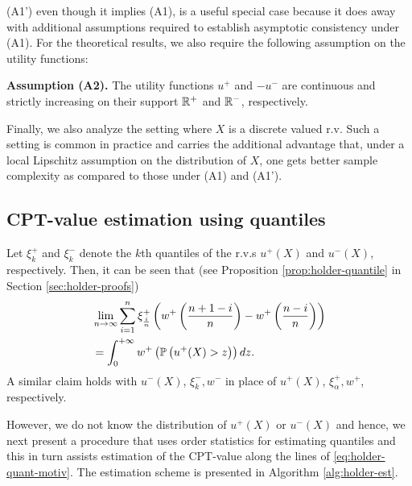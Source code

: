 (A1') even though it implies (A1), is a useful special case because it does away with additional assumptions required to establish asymptotic consistency under (A1). For the theoretical results, we also require the following assumption on the utility functions:

\noindent\textbf{Assumption (A2).}  The utility functions $u^+$ and $-u^-$ are continuous and strictly increasing on their support $\mathbb{R}^+$ and $\mathbb{R}^-$, respectively.

Finally, we also analyze the setting where $X$ is a discrete valued r.v. Such a setting is common in practice and carries the additional advantage that, under a local Lipschitz assumption on the distribution of $X$, one gets better sample complexity as compared to those under (A1) and (A1'). 



\subsection{CPT-value estimation using quantiles}
Let $\xi^+_{k}$ and $\xi^-_{k}$ denote the $k$th quantiles of the r.v.s $u^+(X)$ and $u^-(X)$, respectively. 
Then, it can be seen that (see Proposition \ref{prop:holder-quantile} in Section \ref{sec:holder-proofs})
\begin{align}
&\lim_{n \rightarrow \infty} \sum_{i=1}^{n} \xi^+_{\frac{i}{n}} \left(w^+\left(\frac{n+1-i}{n}\right)- w^+\left(\frac{n-i}{n}\right) \right) \nonumber\\
&= \int_0^{+\infty} w^+\left(\mathbb{P}\left( u^+(X)>z \right)\right) dz.\label{eq:holder-quant-motiv}
\end{align}
A similar claim holds with $u^-(X)$, $\xi^-_{k}, w^-$ in place of  $u^+(X)$, $\xi^+_{\alpha}, w^+$, respectively. 

However, we do not know the distribution of $u^+(X)$ or $u^-(X)$ and hence, we next present a procedure that uses order statistics for estimating quantiles and this in turn assists estimation of the CPT-value along the lines of \eqref{eq:holder-quant-motiv}. The estimation scheme is presented in Algorithm \ref{alg:holder-est}.

